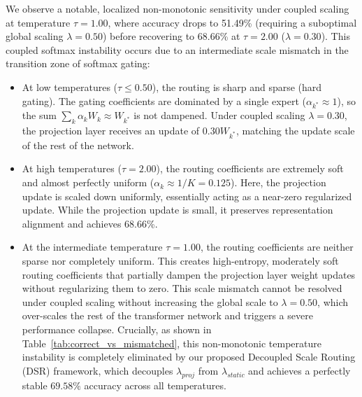 We observe a notable, localized non-monotonic sensitivity under coupled scaling at temperature $\tau=1.00$, where accuracy drops to 51.49\% (requiring a suboptimal global scaling $\lambda=0.50$) before recovering to 68.66\% at $\tau=2.00$ ($\lambda=0.30$). This coupled softmax instability occurs due to an intermediate scale mismatch in the transition zone of softmax gating:
\begin{itemize}
    \item At low temperatures ($\tau \le 0.50$), the routing is sharp and sparse (hard gating). The gating coefficients are dominated by a single expert ($\alpha_{k^*} \approx 1$), so the sum $\sum_k \alpha_k W_k \approx W_{k^*}$ is not dampened. Under coupled scaling $\lambda=0.30$, the projection layer receives an update of $0.30 W_{k^*}$, matching the update scale of the rest of the network.
    \item At high temperatures ($\tau = 2.00$), the routing coefficients are extremely soft and almost perfectly uniform ($\alpha_k \approx 1/K = 0.125$). Here, the projection update is scaled down uniformly, essentially acting as a near-zero regularized update. While the projection update is small, it preserves representation alignment and achieves 68.66\%.
    \item At the intermediate temperature $\tau=1.00$, the routing coefficients are neither sparse nor completely uniform. This creates high-entropy, moderately soft routing coefficients that partially dampen the projection layer weight updates without regularizing them to zero. This scale mismatch cannot be resolved under coupled scaling without increasing the global scale to $\lambda=0.50$, which over-scales the rest of the transformer network and triggers a severe performance collapse. Crucially, as shown in Table~\ref{tab:correct_vs_mismatched}, this non-monotonic temperature instability is completely eliminated by our proposed Decoupled Scale Routing (DSR) framework, which decouples $\lambda_{proj}$ from $\lambda_{static}$ and achieves a perfectly stable $69.58\%$ accuracy across all temperatures.
\end{itemize}

